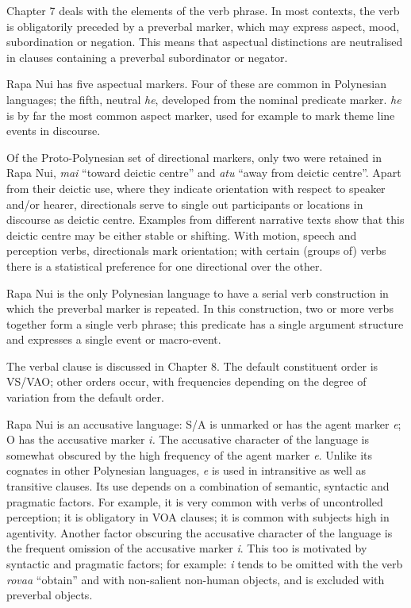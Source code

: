 \medskip Chapter 7 deals with the elements of the verb phrase. In most contexts, the verb is obligatorily preceded by a preverbal marker, which may express aspect, mood, subordination or negation. This means that aspectual distinctions are neutralised in clauses containing a preverbal subordinator or negator. 

Rapa Nui has five aspectual markers. Four of these are common in Polynesian languages; the fifth, neutral \textit{he}, developed from the nominal predicate marker. \textit{he} is by far the most common aspect marker, used for example to mark theme line events in discourse.

Of the Proto-Polynesian set of directional markers, only two were retained in Rapa Nui, \textit{mai} “toward deictic centre” and \textit{atu} “away from deictic centre”. Apart from their deictic use, where they indicate orientation with respect to speaker and/or hearer, directionals serve to single out participants or locations in discourse as deictic centre. Examples from different narrative texts show that this deictic centre may be either stable or shifting. With motion, speech and perception verbs, directionals mark orientation; with certain (groups of) verbs there is a statistical preference for one directional over the other.

Rapa Nui is the only Polynesian language to have a serial verb construction in which the preverbal marker is repeated. In this construction, two or more verbs together form a single verb phrase; this predicate has a single argument structure and expresses a single event or macro-event.

\medskip The verbal clause is discussed in Chapter 8. The default constituent order is VS/VAO; other orders occur, with frequencies depending on the degree of variation from the default order.

Rapa Nui is an accusative language: S/A is unmarked or has the agent marker \textit{e}; O has the accusative marker \textit{i.} The accusative character of the language is somewhat obscured by the high frequency of the agent marker \textit{e}. Unlike its cognates in other Polynesian languages, \textit{e} is used in intransitive as well as transitive clauses. Its use depends on a combination of semantic, syntactic and pragmatic factors. For example, it is very common with verbs of uncontrolled perception; it is obligatory in VOA clauses; it is common with subjects high in agentivity. Another factor obscuring the accusative character of the language is the frequent omission of the accusative marker \textit{i}. This too is motivated by syntactic and pragmatic factors; for example: \textit{i} tends to be omitted with the verb \textit{rova{\ꞌ}a} “obtain” and with non-salient non-human objects, and is excluded with preverbal objects.


